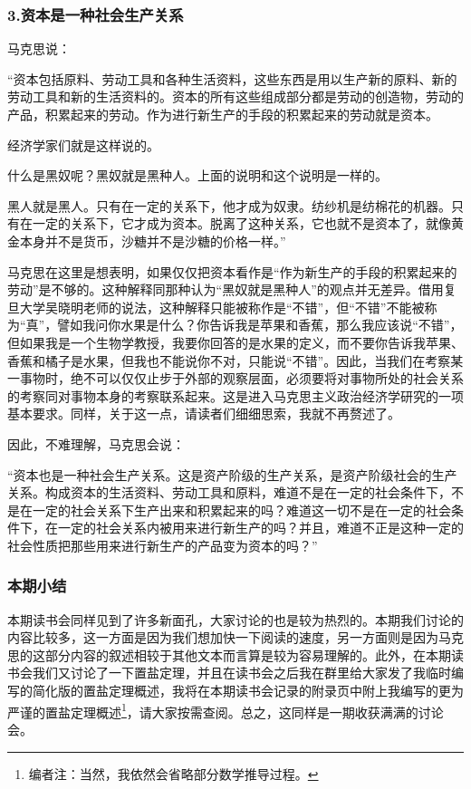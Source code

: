 \documentclass[a4paper,twoside,12pt,AutoFakeBold]{ctexart}
\begin{document}
\subsubsection{3.资本是一种社会生产关系}
马克思说：
\begin{adjustwidth}{2em}{2em}
    \qquad\fangsong
“资本包括原料、劳动工具和各种生活资料，这些东西是用以生产新的原料、新的劳动工具和新的生活资料的。资本的所有这些组成部分都是劳动的创造物，劳动的产品，积累起来的劳动。作为进行新生产的手段的积累起来的劳动就是资本。

经济学家们就是这样说的。

什么是黑奴呢？黑奴就是黑种人。上面的说明和这个说明是一样的。

黑人就是黑人。只有在一定的关系下，他才成为奴隶。纺纱机是纺棉花的机器。只有在一定的关系下，它才成为资本。脱离了这种关系，它也就不是资本了，就像黄金本身并不是货币，沙糖并不是沙糖的价格一样。”
\end{adjustwidth}
马克思在这里是想表明，如果仅仅把资本看作是“作为新生产的手段的积累起来的劳动”是不够的。这种解释同那种认为“黑奴就是黑种人”的观点并无差异。借用复旦大学吴晓明老师的说法，这种解释只能被称作是“不错”，但“不错”不能被称为“真”，譬如我问你水果是什么？你告诉我是苹果和香蕉，那么我应该说“不错”，但如果我是一个生物学教授，我要你回答的是水果的定义，而不要你告诉我苹果、香蕉和橘子是水果，但我也不能说你不对，只能说“不错”。因此，当我们在考察某一事物时，绝不可以仅仅止步于外部的观察层面，必须要将对事物所处的社会关系的考察同对事物本身的考察联系起来。这是进入马克思主义政治经济学研究的一项基本要求。同样，关于这一点，请读者们细细思索，我就不再赘述了。

因此，不难理解，马克思会说：

\begin{adjustwidth}{2em}{2em}
    \qquad\fangsong
    “资本也是一种社会生产关系。这是资产阶级的生产关系，是资产阶级社会的生产关系。构成资本的生活资料、劳动工具和原料，难道不是在一定的社会条件下，不是在一定的社会关系下生产出来和积累起来的吗？难道这一切不是在一定的社会条件下，在一定的社会关系内被用来进行新生产的吗？并且，难道不正是这种一定的社会性质把那些用来进行新生产的产品变为资本的吗？”
\end{adjustwidth}

\subsubsection{本期小结}
本期读书会同样见到了许多新面孔，大家讨论的也是较为热烈的。本期我们讨论的内容比较多，这一方面是因为我们想加快一下阅读的速度，另一方面则是因为马克思的这部分内容的叙述相较于其他文本而言算是较为容易理解的。此外，在本期读书会我们又讨论了一下置盐定理，并且在读书会之后我在群里给大家发了我临时编写的简化版的置盐定理概述，我将在本期读书会记录的附录页中附上我编写的更为严谨的置盐定理概述\footnote{编者注：当然，我依然会省略部分数学推导过程。}，请大家按需查阅。总之，这同样是一期收获满满的讨论会。
\end{document}
